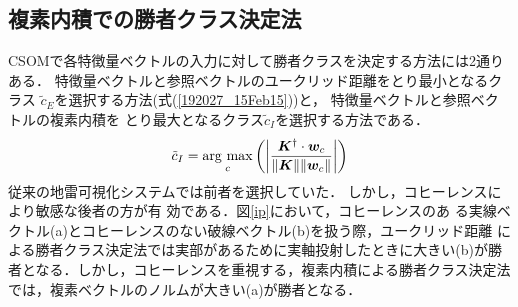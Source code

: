﻿\documentclass[12pt,oneside]{jsbook}
\newcommand{\argmax}{\mathop{\rm arg~max}\limits}
\begin{document}
%
%

\subsection{複素内積での勝者クラス決定法}
CSOMで各特徴量ベクトルの入力に対して勝者クラスを決定する方法には2通りある．
特徴量ベクトルと参照ベクトルのユークリッド距離をとり最小となるクラス
$\tilde{c}_E$を選択する方法(式(\ref{192027_15Feb15}))と，
特徴量ベクトルと参照ベクトルの複素内積を
とり最大となるクラス$\tilde{c}_I$を選択する方法\cite{2010Yoshida}である．
\begin{eqnarray}
\tilde{c}_I = \argmax_{c} \left( \left|
 \frac{{\bm K}^{\dagger}\cdot{\bm w_c}}{ \|{\bm K}\| \| {\bm w_c} \| }
                                   \right| \right)
\end{eqnarray}
従来の地雷可視化システムでは前者を選択していた．
しかし，コヒーレンスにより敏感な後者の方が有
効である\cite{aoyagi}．図\ref{ip}において，コヒーレンスのあ
る実線ベクトル(a)とコヒーレンスのない破線ベクトル(b)を扱う際，ユークリッド距離
による勝者クラス決定法では実部があるために実軸投射したときに大きい(b)が勝
者となる．しかし，コヒーレンスを重視する，複素内積による勝者クラス決定法
では，複素ベクトルのノルムが大きい(a)が勝者となる．
\end{document}
